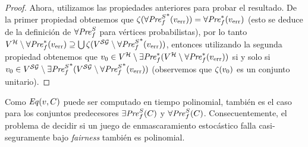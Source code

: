 \begin{proof}
       
       Ahora, utilizamos las propiedades anteriores para probar el resultado. De la primer propiedad obtenemos que $\zeta({\forall\mathit{Pre}^S_f}^*(v_{\text{err}})) = \forall\mathit{Pre}_f^*(v_{\text{err}})$ (esto se deduce de la definición de $\forall\mathit{Pre}^S_f$ para vértices probabilistas),  
       por lo tanto $V^{\mathcal{H}} \setminus \forall\mathit{Pre}_f^*(v_{\text{err}}) \supseteq \bigcup \zeta(V^{\mathcal{SG}} \setminus {\forall\mathit{Pre}^S_f}^*(v_{\text{err}}))$, entonces utilizando la segunda propiedad obtenemos que $v_0 \in V^{\mathcal{H}} \setminus \exists\mathit{Pre}_f^*(V^{\mathcal{H}} \setminus \forall\mathit{Pre}_f^*(v_{\text{err}}))$ si y solo si   
       $v_0 \in V^{\mathcal{SG}} \setminus {\exists\mathit{Pre}^S_f}^*(V^{\mathcal{SG}} \setminus {\forall\mathit{Pre}^S_f}^*(v_{\text{err}}))$ (observemos que $\zeta(v_0)$ es un conjunto unitario).
\end{proof}
\fi
Como $\mathit{Eq}(v,C)$ puede ser computado en tiempo polinomial, también es el caso para los conjuntos predecesores $\exists\mathit{Pre}^S_f(C)$ y $\forall\mathit{Pre}^S_f(C)$.  Consecuentemente, el problema de decidir si un juego de enmascaramiento estocástico falla casi-seguramente bajo \emph{fairness} también es polinomial.

